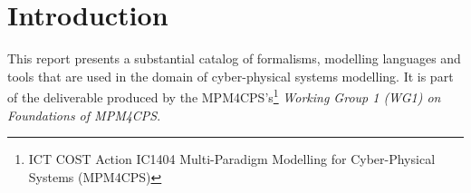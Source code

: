 \documentclass[final]{include/MPM4CPS/MPM4CPS-Report} %
\begin{document}
\makerro


\def\docversion{2.0}
\def\docdate{January 8, 2017}


\maketitle


\cleardoublepage


%

%


\tableofcontents


\mainmatter


\chapter{Introduction}
\label{ch:introduction}


This report presents a substantial catalog of formalisms, modelling languages and tools that are used in the domain of cyber-physical systems modelling.
It is part of the deliverable produced by the MPM4CPS's\footnote{ICT COST Action IC1404 Multi-Paradigm Modelling for Cyber-Physical Systems (MPM4CPS)} \emph{Working Group 1 (WG1) on Foundations of MPM4CPS}.
\end{document}
